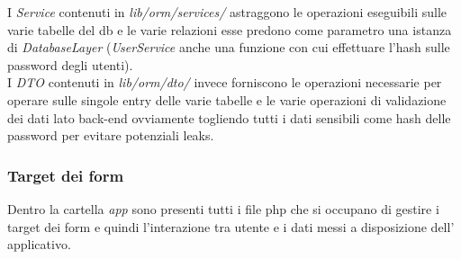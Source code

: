 I \textit{Service} contenuti in \textit{lib/orm/services/}
astraggono le operazioni eseguibili sulle varie tabelle del db e le varie
relazioni esse predono come parametro una istanza di \textit{DatabaseLayer}
(\textit{UserService} anche una funzione con cui effettuare l'hash sulle
password degli utenti).\\

I \textit{DTO} contenuti in \textit{lib/orm/dto/} invece forniscono le
operazioni necessarie per operare sulle singole entry delle varie tabelle e
le varie operazioni di validazione dei dati lato back-end ovviamente
togliendo tutti i dati sensibili come hash delle password per evitare
potenziali leaks.

\subsubsection{Target dei form}
Dentro la cartella \textit{app} sono presenti tutti i file php che si occupano
di gestire i target dei form e quindi l'interazione tra utente e i dati messi
a disposizione dell' applicativo.

